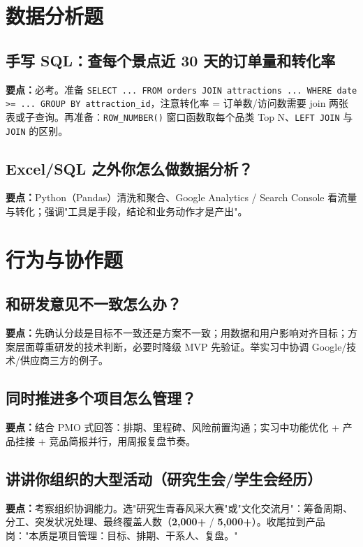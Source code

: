 \documentclass[zihao=-4,autoindent=2em]{ctexart}
\begin{document}
\section{数据分析题}

\subsection{手写 SQL：查每个景点近 30 天的订单量和转化率}
\textbf{要点：}必考。准备 \texttt{SELECT ... FROM orders JOIN attractions ... WHERE date >= ... GROUP BY attraction\_id}，注意转化率 = 订单数/访问数需要 join 两张表或子查询。再准备：\texttt{ROW\_NUMBER()} 窗口函数取每个品类 Top N、\texttt{LEFT JOIN} 与 \texttt{JOIN} 的区别。

\subsection{Excel/SQL 之外你怎么做数据分析？}
\textbf{要点：}Python（Pandas）清洗和聚合、Google Analytics / Search Console 看流量与转化；强调"工具是手段，结论和业务动作才是产出"。

\section{行为与协作题}

\subsection{和研发意见不一致怎么办？}
\textbf{要点：}先确认分歧是目标不一致还是方案不一致；用数据和用户影响对齐目标；方案层面尊重研发的技术判断，必要时降级 MVP 先验证。举实习中协调 Google/技术/供应商三方的例子。

\subsection{同时推进多个项目怎么管理？}
\textbf{要点：}结合 PMO 式回答：排期、里程碑、风险前置沟通；实习中功能优化 + 产品挂接 + 竞品简报并行，用周报复盘节奏。

\subsection{讲讲你组织的大型活动（研究生会/学生会经历）}
\textbf{要点：}考察组织协调能力。选"研究生青春风采大赛"或"文化交流月"：筹备周期、分工、突发状况处理、最终覆盖人数（\textbf{2,000+} / \textbf{5,000+}）。收尾拉到产品岗："本质是项目管理：目标、排期、干系人、复盘。"
\end{document}
